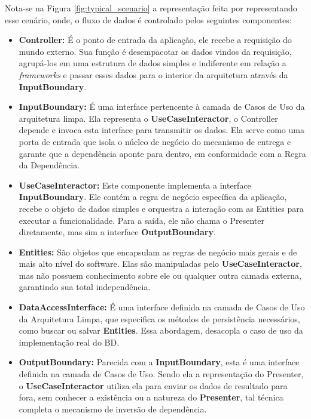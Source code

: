     \par Nota-se na Figura \ref{fig:typical_scenario} a representação feita por \cite{livro:martin:cleanarch} representando esse cenário, onde, o fluxo de dados é controlado pelos seguintes componentes:

    \begin{itemize}
        \item \textbf{Controller:} É o ponto de entrada da aplicação, ele recebe a requisição do mundo externo. Sua função é desempacotar os dados vindos da requisição, agrupá-los em uma estrutura de dados simples e indiferente em relação a \textit{frameworks} e passar esses dados para o interior da arquitetura através da \textbf{InputBoundary}.

        \item \textbf{InputBoundary:} É uma interface pertencente à camada de Casos de Uso da arquitetura limpa. Ela representa o \textbf{UseCaseInteractor}, o Controller depende e invoca esta interface para transmitir os dados. Ela serve como uma porta de entrada que isola o núcleo de negócio do mecanismo de entrega e garante que a dependência aponte para dentro, em conformidade com a Regra da Dependência.

        \item \textbf{UseCaseInteractor:} Este componente implementa a interface \textbf{InputBoundary}. Ele contém a regra de negócio específica da aplicação, recebe o objeto de dados simples e orquestra a interação com as Entities para executar a funcionalidade. Para a saída, ele não chama o Presenter diretamente, mas sim a interface \textbf{OutputBoundary}.


        \item \textbf{Entities:} São objetos que encapsulam as regras de negócio mais gerais e de mais alto nível do software. Elas são manipuladas pelo \textbf{UseCaseInteractor}, mas não possuem conhecimento sobre ele ou qualquer outra camada externa, garantindo sua total independência.
        
        
        \item \textbf{DataAccessInterface:} É uma interface definida na camada de Casos de Uso da Arquitetura Limpa, que especifica os métodos de persistência necessários, como buscar ou salvar \textbf{Entities}. Essa abordagem, desacopla o caso de uso da implementação real do BD.
        
        \item \textbf{OutputBoundary:} Parecida com a \textbf{InputBoundary}, esta é uma interface definida na camada de Casos de Uso. Sendo ela a representação do Presenter, o \textbf{UseCaseInteractor} utiliza ela para enviar os dados de resultado para fora, sem conhecer a existência ou a natureza do \textbf{Presenter}, tal técnica completa o mecanismo de inversão de dependência.
        

\end{itemize}
